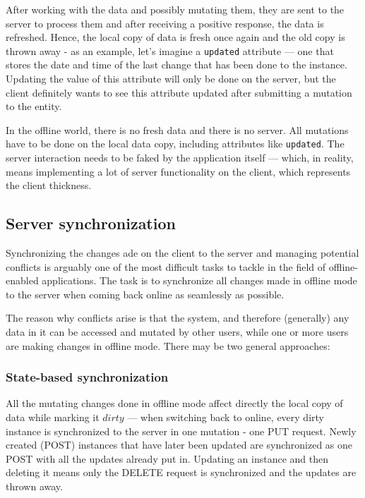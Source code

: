 \documentclass[
  digital,     %
  color,       %
  oneside,     %
  nosansbold,  %
  nocolorbold, %
  lof,         %
  lot,         %
]{fithesis4}
\begin{document}
After working with the data and possibly mutating them, they are sent to the server to process them and after receiving a positive response, the data is refreshed. Hence, the local copy of data is fresh once again and the old copy is thrown away - as an example, let's imagine a \texttt{updated} attribute --- one that stores the date and time of the last change that has been done to the instance. Updating the value of this attribute will only be done on the server, but the client definitely wants to see this attribute updated after submitting a mutation to the entity.

In the offline world, there is no fresh data and there is no server. All mutations have to be done on the local data copy, including attributes like \texttt{updated}. The server interaction needs to be faked by the application itself --- which, in reality, means implementing a lot of server functionality on the client, which represents the client thickness. 

\subsection{Server synchronization}
Synchronizing the changes ade on the client to the server and managing potential conflicts is arguably one of the most difficult tasks to tackle in the field of offline-enabled applications. The task is to synchronize all changes made in offline mode to the server when coming back online as seamlessly as possible. 

The reason why conflicts arise is that the system, and therefore (generally) any data in it can be accessed and mutated by other users, while one or more users are making changes in offline mode. There may be two general approaches:
\subsubsection{State-based synchronization}
All the mutating changes done in offline mode affect directly the local copy of data while marking it $dirty$ --- when switching back to online, every dirty instance is synchronized to the server in one mutation - one PUT request. Newly created (POST) instances that have later been updated are synchronized as one POST with all the updates already put in. Updating an instance and then deleting it means only the DELETE request is synchronized and the updates are thrown away.
\end{document}

